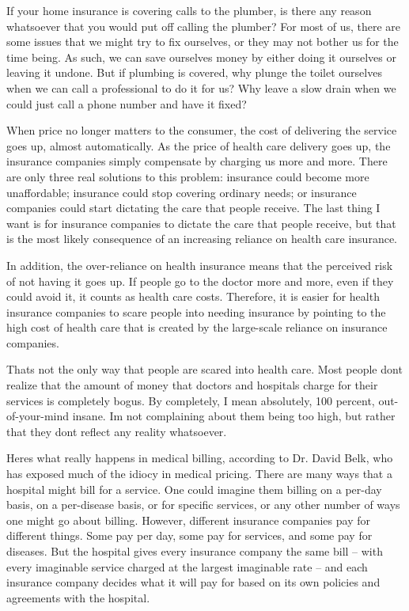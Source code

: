 If your home insurance is covering calls to the plumber, is there any
reason whatsoever
that you would put off calling the plumber?  For most of us, there are
some issues that we might try to fix ourselves, or they may not bother
us for the time being. As such, we can save ourselves money by either
doing it ourselves or leaving it undone.
But if plumbing is
covered, why plunge the toilet ourselves when we can call a
professional to do it for us?  Why leave a slow drain when we could
just call a phone number and have it fixed? 

When price no longer matters to the consumer, the cost of delivering the
service goes up, almost automatically. As the price of health care
delivery goes up, the insurance companies simply compensate by charging
us more and more. There are only three real solutions to this problem:
insurance could become more unaffordable; insurance could stop covering
ordinary needs; or insurance companies could start dictating the care
that people receive. The last thing I want is for insurance companies
to dictate the care that people receive, but that is the most likely
consequence of an increasing reliance on health care insurance.

In addition, the over-reliance on health insurance means that the
perceived risk of not having it goes up. If people go to the doctor
more and more, even if they could avoid it, it counts as health care
costs. Therefore, it is easier for health insurance companies to scare
people into needing insurance by pointing to the high cost of health
care that is created by the large-scale reliance on insurance
companies. 

That{\textquotesingle}s not the only way that people are scared into
health care. Most people don{\textquotesingle}t realize that the amount
of money that doctors and hospitals charge for their services is
completely bogus. By completely, I mean absolutely, 100 percent,
out-of-your-mind insane. I{\textquotesingle}m not complaining about
them being too high, but rather that they don{\textquotesingle}t
reflect any reality whatsoever. 

Here{\textquotesingle}s what really happens in medical billing,
according to Dr. David Belk, who has exposed much of the idiocy in
medical pricing. There are many ways that a hospital might bill for a
service. One could imagine them billing on a per-day basis, on a
per-disease basis, or for specific services, or any
other number of ways
one might go about billing. However, different insurance companies pay
for different things. Some pay per day, some pay for services, and some
pay for diseases.  But the hospital gives every insurance company the
same bill – with every imaginable service charged at the largest
imaginable rate – and each insurance company decides what it will pay
for based on its own policies and agreements with the hospital.

